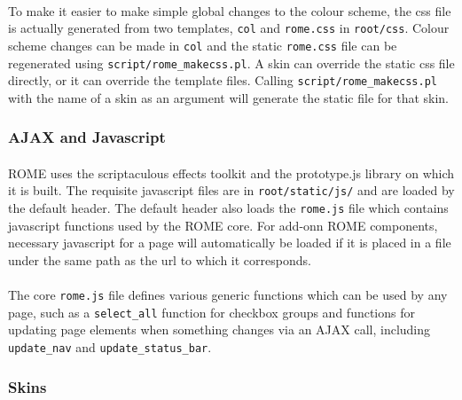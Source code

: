 \paragraph{}
To make it easier to make simple global changes to the colour scheme, the css file is actually generated from two templates, \texttt{col} and \texttt{rome.css} in \texttt{root/css}. Colour scheme changes can be made in \texttt{col} and the static \texttt{rome.css} file can be regenerated using \texttt{script/rome\_makecss.pl}. A skin can override the static css file directly, or it can override the template files. Calling \texttt{script/rome\_makecss.pl} with the name of a skin as an argument will generate the static file for that skin.


\subsubsection{AJAX and Javascript}
\label{sec:view_javascript}

\paragraph{}
ROME uses the scriptaculous effects toolkit and the prototype.js library on which it is built. The requisite javascript files are in \texttt{root/static/js/} and are loaded by the default header. The default header also loads the \texttt{rome.js} file which contains javascript functions used by the ROME core. For add-onn ROME components, necessary javascript for a page will automatically be loaded if it is placed in a file under the same path as the url to which it corresponds. 

\paragraph{}
The core \texttt{rome.js} file defines various generic functions which can be used by any page, such as a \texttt{select\_all} function for checkbox groups and functions for updating  page elements when something changes via an AJAX call, including \texttt{update\_nav} and \texttt{update\_status\_bar}.

\subsubsection{Skins}
\label{sec:view_skins}

